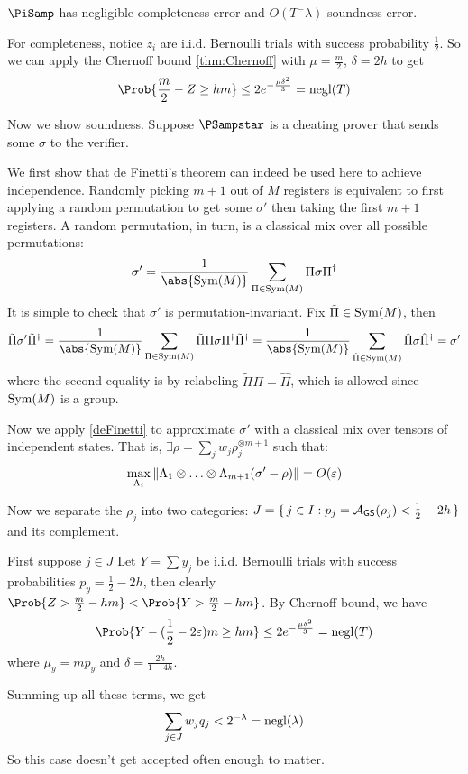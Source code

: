 \begin{thm}
    \label{QPIP1thm}
	$\PiSamp$ has negligible completeness error and $O(T^-\lambda)$ soundness error.
\end{thm}
\begin{prf}
	For completeness, notice $z_i$ are i.i.d. Bernoulli trials with success probability $\frac{1}{2}$.
	So we can apply the Chernoff bound \cref{thm:Chernoff} with $\mu=\frac{m}{2}$, $\delta=2h$ to get
	$$\Prob{\frac{m}{2}-Z\geq hm}\leq2e^{-\frac{\mu\delta^2}{3}}=\negl(T)$$

	Now we show soundness.
	Suppose $\PSampstar$ is a cheating prover that sends some $\sigma$ to the verifier.

	We first show that de Finetti's theorem can indeed be used here to achieve independence.
	Randomly picking $m+1$ out of $M$ registers is equivalent to first applying a random permutation to get some $\sigma'$ then taking the first $m+1$ registers.
	A random permutation, in turn, is a classical mix over all possible permutations:
	$$\sigma'=\frac{1}{\abs{\Sym(M)}}\sum_{\Pi\in\Sym(M)}\Pi\sigma\Pi^\dagger$$
	It is simple to check that $\sigma'$ is permutation-invariant.
	Fix $\tilde{\Pi}\in\operatorname{Sym}(M)$, then
	$$\tilde{\Pi}\sigma'\tilde{\Pi}^\dagger
	=\frac{1}{\abs{\Sym(M)}}\sum_{\Pi\in\Sym(M)}\tilde{\Pi}\Pi\sigma\Pi^\dagger\tilde{\Pi}^\dagger
	=\frac{1}{\abs{\Sym(M)}}\sum_{\hat{\Pi}\in\Sym(M)}\hat{\Pi}\sigma\hat{\Pi}^\dagger
	=\sigma'$$
	where the second equality is by relabeling $\tilde{\Pi}\Pi=\hat{\Pi}$, which is allowed since $\operatorname{Sym}(M)$ is a group.

	Now we apply \cref{deFinetti} to approximate $\sigma'$ with a classical mix over tensors of independent states.
	That is, $\exists\rho=\sum_j w_j\rho_j^{\otimes m+1}$ such that:
	$$\max_{\Lambda_i}\left\lVert\Lambda_1\otimes\ldots\otimes\Lambda_{m+1}(\sigma'-\rho)\right\rVert=O(\varepsilon)$$

	Now we separate the $\rho_j$ into two categories: $J=\set{j\in I:p_j=\mathcal{A}_{\mathsf{GS}}(\rho_j)<\frac{1}{2}-2h}$ and its complement. 

	First suppose $j\in J$
	Let $Y=\sum y_j$ be i.i.d. Bernoulli trials with success probabilities $p_y=\frac{1}{2}-2h$,
	then clearly $\Prob{Z>\frac{m}{2}-hm}<\Prob{Y>\frac{m}{2}-hm}$.
	By Chernoff bound, we have
	$$\Prob{Y-(\frac{1}{2}-2\varepsilon)m\geq hm}\leq2e^{-\frac{\mu\delta^2}{3}}=\negl(T)$$
	where $\mu_y=mp_y$ and $\delta=\frac{2h}{1-4h}$.

	Summing up all these terms, we get
	$$\sum_{j\in J} w_j q_j<2^{-\lambda}=\operatorname{negl}(\lambda)$$
	So this case doesn't get accepted often enough to matter.


\end{prf}
